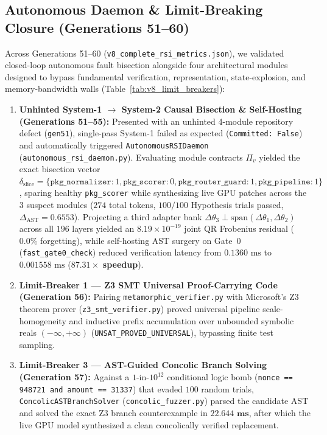 \documentclass[10pt,twocolumn,letterpaper]{article}
\begin{document}
\subsection{Autonomous Daemon \& Limit-Breaking Closure (Generations 51--60)}
Across Generations 51--60 (\texttt{v8\_\allowbreak complete\_\allowbreak rsi\_\allowbreak metrics.json}), we validated closed-loop autonomous fault bisection alongside four architectural modules designed to bypass fundamental verification, representation, state-explosion, and memory-bandwidth walls (Table~\ref{tab:v8_limit_breakers}):
\begin{enumerate}
    \item \textbf{Unhinted System-1 $\to$ System-2 Causal Bisection \& Self-Hosting (Generations 51--55):} Presented with an unhinted 4-module repository defect (\texttt{gen51}), single-pass System-1 failed as expected (\texttt{Committed: False}) and automatically triggered \texttt{Autonomous\allowbreak RSIDaemon} (\texttt{autonomous\_\allowbreak rsi\_\allowbreak daemon.py}). Evaluating module contracts $\Pi_{v}$ yielded the exact bisection vector $\delta_{\text{slice}}=\{\texttt{pkg\_normalizer}: 1, \texttt{pkg\_scorer}: 0, \texttt{pkg\_router\_guard}: 1, \texttt{pkg\_pipeline}: 1\}$, sparing healthy \texttt{pkg\_scorer} while synthesizing live GPU patches across the 3 suspect modules ($274$ total tokens, $100/100$ Hypothesis trials passed, $\Delta_{\text{AST}}=0.6553$). Projecting a third adapter bank $\Delta\theta_{3}\perp\text{span}(\Delta\theta_{1},\Delta\theta_{2})$ across all $196$ layers yielded an $8.19\times 10^{-19}$ joint QR Frobenius residual ($0.0\%$ forgetting), while self-hosting AST surgery on Gate~0 (\texttt{fast\_\allowbreak gate0\_\allowbreak check}) reduced verification latency from $0.1360\text{ ms}$ to $0.001558\text{ ms}$ ($\mathbf{87.31\times}$ \textbf{speedup}).
    \item \textbf{Limit-Breaker 1 --- Z3 SMT Universal Proof-Carrying Code (Generation 56):} Pairing \texttt{metamorphic\_\allowbreak verifier.py} with Microsoft's Z3 theorem prover (\texttt{z3\_\allowbreak smt\_\allowbreak verifier.py}) proved universal pipeline scale-homogeneity and inductive prefix accumulation over unbounded symbolic reals $(-\infty,+\infty)$ (\texttt{UNSAT\_\allowbreak PROVED\_\allowbreak UNIVERSAL}), bypassing finite test sampling.
    \item \textbf{Limit-Breaker 3 --- AST-Guided Concolic Branch Solving (Generation 57):} Against a $1\text{-in-}10^{12}$ conditional logic bomb (\texttt{nonce == 948721 and amount == 31337}) that evaded $100$ random trials, \texttt{Concolic\allowbreak ASTBranch\allowbreak Solver} (\texttt{concolic\_\allowbreak fuzzer.py}) parsed the candidate AST and solved the exact Z3 branch counterexample in $\mathbf{22.644\text{ ms}}$, after which the live GPU model synthesized a clean concolically verified replacement.

\end{enumerate}
\end{document}
